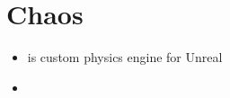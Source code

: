 \chapter{Chaos}
    \begin{itemize}
        \item  {} is custom physics engine for Unreal
        \item 
    \end{itemize}

